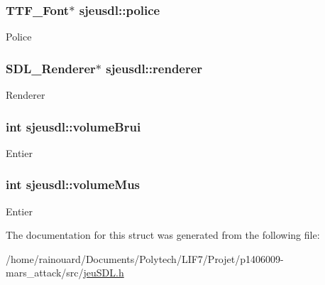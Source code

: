 \subsubsection[{\texorpdfstring{police}{police}}]{\setlength{\rightskip}{0pt plus 5cm}T\+T\+F\+\_\+\+Font$\ast$ sjeusdl\+::police}\hypertarget{structsjeusdl_aaf97bfa71ccc7076ea1be9a2ff0b02af}{}\label{structsjeusdl_aaf97bfa71ccc7076ea1be9a2ff0b02af}
Police 
\subsubsection[{\texorpdfstring{renderer}{renderer}}]{\setlength{\rightskip}{0pt plus 5cm}S\+D\+L\+\_\+\+Renderer$\ast$ sjeusdl\+::renderer}\hypertarget{structsjeusdl_ace97cd01fc6707fd9bcf0430fd5869fa}{}\label{structsjeusdl_ace97cd01fc6707fd9bcf0430fd5869fa}
Renderer 
\subsubsection[{\texorpdfstring{volume\+Brui}{volumeBrui}}]{\setlength{\rightskip}{0pt plus 5cm}int sjeusdl\+::volume\+Brui}\hypertarget{structsjeusdl_ac11351451a2de6ae145e4ec39918f1b9}{}\label{structsjeusdl_ac11351451a2de6ae145e4ec39918f1b9}
Entier 
\subsubsection[{\texorpdfstring{volume\+Mus}{volumeMus}}]{\setlength{\rightskip}{0pt plus 5cm}int sjeusdl\+::volume\+Mus}\hypertarget{structsjeusdl_a5406bc418f53a24a9cfc35cb36cd32c2}{}\label{structsjeusdl_a5406bc418f53a24a9cfc35cb36cd32c2}
Entier 

The documentation for this struct was generated from the following file\+:\begin{DoxyCompactItemize}
\item 
/home/rainouard/\+Documents/\+Polytech/\+L\+I\+F7/\+Projet/p1406009-\/mars\+\_\+attack/src/\hyperlink{jeuSDL_8h}{jeu\+S\+D\+L.\+h}\end{DoxyCompactItemize}
